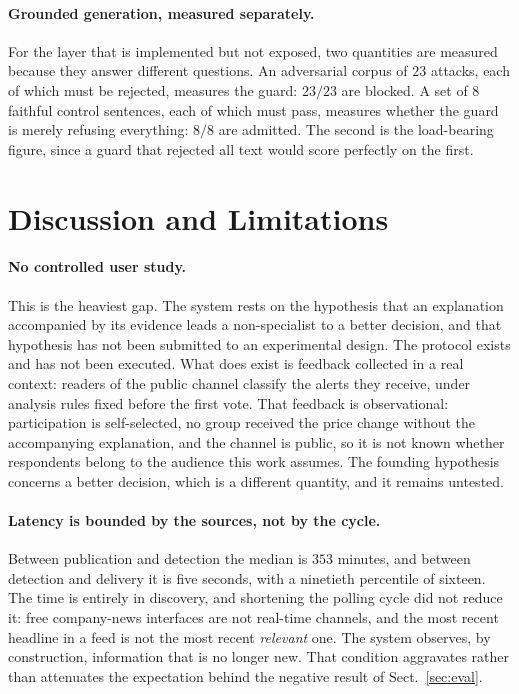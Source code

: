 \documentclass[runningheads]{llncs}
\begin{document}
\paragraph{Grounded generation, measured separately.} For the layer that is implemented but
not exposed, two quantities are measured because they answer different questions. An
adversarial corpus of $23$ attacks, each of which must be rejected, measures the guard:
$23/23$ are blocked. A set of $8$ faithful control sentences, each of which must pass,
measures whether the guard is merely refusing everything: $8/8$ are admitted. The second is
the load-bearing figure, since a guard that rejected all text would score perfectly on the
first.

\section{Discussion and Limitations}

\paragraph{No controlled user study.} This is the heaviest gap. The system rests on the
hypothesis that an explanation accompanied by its evidence leads a non-specialist to a
better decision, and that hypothesis has not been submitted to an experimental design. The
protocol exists and has not been executed. What does exist is feedback collected in a real
context: readers of the public channel classify the alerts they receive, under analysis
rules fixed before the first vote. That feedback is observational: participation is
self-selected, no group received the price change without the accompanying explanation, and
the channel is public, so it is not known whether respondents belong to the audience this
work assumes. The founding hypothesis concerns a better decision, which is a different
quantity, and it remains untested.

\paragraph{Latency is bounded by the sources, not by the cycle.} Between publication and
detection the median is $353$ minutes, and between detection and delivery it is five seconds,
with a ninetieth percentile of sixteen.
The time is entirely in discovery, and shortening the polling cycle did not reduce it: free
company-news interfaces are not real-time channels, and the most recent headline in a feed
is not the most recent \emph{relevant} one. The system observes, by construction,
information that is no longer new. That condition aggravates rather than attenuates the
expectation behind the negative result of Sect.~\ref{sec:eval}.
\end{document}
